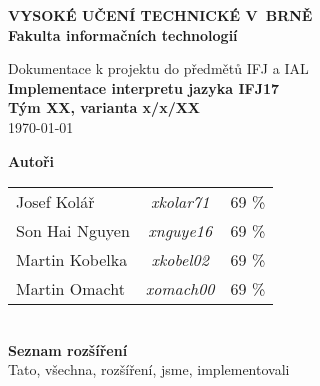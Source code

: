 \begin{titlepage}
    \centering

    {\fontsize{20pt}{15pt}\bfseries
    VYSOKÉ UČENÍ TECHNICKÉ V~BRNĚ\\
    \vspace{8pt}
    Fakulta informačních technologií
    }

    \vspace*{64pt}

    
    \vspace*{22pt}

    {\Large Dokumentace k projektu do předmětů IFJ a IAL\\}
    \vspace*{4pt}
    {\LARGE \bfseries Implementace interpretu jazyka IFJ17\\}
    \vspace*{62pt}
    {\Large \bfseries Tým XX, varianta x/x/XX\\}
    \vspace*{42pt}
    {\Large \today}

    \vspace*{64pt}
    {\Large \bfseries Autoři\\}
    \vspace*{8pt}
    \begin{tabular}{ l c r }
        Josef Kolář & \textit{xkolar71} & 69 \% \\
        Son Hai Nguyen & \textit{xnguye16} & 69 \% \\
        Martin Kobelka & \textit{xkobel02} & 69 \% \\
        Martin Omacht & \textit{xomach00} & 69 \% \\
    \end{tabular}\\
    \vspace*{32pt}
    {\Large \bfseries Seznam rozšíření\\}
    \vspace*{8pt}
    Tato, všechna, rozšíření, jsme, implementovali\\
    \vspace*{64pt}

\end{titlepage}
